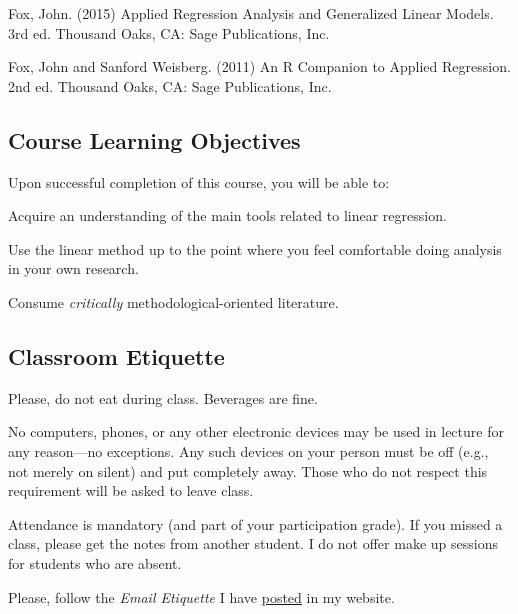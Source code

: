 \documentclass[letterpaper]{article}
\renewenvironment{itemize}{
  \begin{list}{}{
    \setlength{\leftmargin}{1.5em}
  }
}{
  \end{list}
}
\begin{document}
\begin{itemize}
	\item[$\bullet$] Fox, John. (2015) Applied Regression Analysis and Generalized Linear Models. 3rd ed. Thousand Oaks, CA: Sage Publications, Inc.
	\item[$\bullet$] Fox, John and Sanford Weisberg. (2011) An R Companion to Applied Regression. 2nd ed. Thousand Oaks, CA: Sage Publications, Inc.
\end{itemize}


\subsection*{Course Learning Objectives}
 
Upon successful completion of this course, you will be able to:

\begin{itemize}
	\item[$\bullet$] Acquire an understanding of the main tools related to linear regression.
	\item[$\bullet$] Use the linear method up to the point where you feel comfortable doing analysis in your own research.
	\item[$\bullet$] Consume \emph{critically} methodological-oriented literature.
\end{itemize}








\subsection*{Classroom Etiquette}
 

\begin{itemize}
	\item[$\bullet$] Please, do not eat during class. Beverages are fine.
	\item[$\bullet$] No computers, phones, or any other electronic devices may be used in lecture for any reason---no exceptions. Any such devices on your person must be off (e.g., not merely on silent) and put completely away. Those who do not respect this requirement will be asked to leave class.
	\item[$\bullet$] Attendance is mandatory (and part of your participation grade). If you missed a class, please get the notes from another student. I do not offer make up sessions for students who are absent.
	\item[$\bullet$] Please, follow the \emph{Email Etiquette} I have \href{http://www.hectorbahamonde.com/resources/}{posted} in my website.
\end{itemize}
\end{document}
